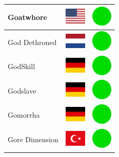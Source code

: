 \documentclass[12pt, a4paper, twoside]{report}
\begin{document}
\begin{center}
\begin{longtable}{|p{5cm}|p{2cm}|p{2cm}|}
 Goatwhore                                                  & \includegraphics[width=1cm]{../img/flags/us} &   \includegraphics[width=1cm]{../likes/y} \\ \hline
 God Dethroned                                              & \includegraphics[width=1cm]{../img/flags/nl} &   \includegraphics[width=1cm]{../likes/y} \\ \hline
 GodSkill                                                   & \includegraphics[width=1cm]{../img/flags/de} &   \includegraphics[width=1cm]{../likes/y} \\ \hline
 Godslave                                                   & \includegraphics[width=1cm]{../img/flags/de} &   \includegraphics[width=1cm]{../likes/y} \\ \hline
 Gomorrha                                                   & \includegraphics[width=1cm]{../img/flags/de} &   \includegraphics[width=1cm]{../likes/y} \\ \hline
 Gore Dimension                                             & \includegraphics[width=1cm]{../img/flags/tr} &   \includegraphics[width=1cm]{../likes/y} \\ \hline

\end{longtable}
\end{center}
\end{document}
